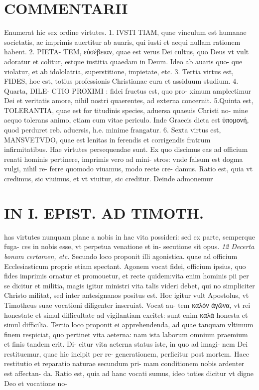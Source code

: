 \documentclass{article}
\begin{document}
\begin{pages}
\section*{COMMENTARII }
\marginpar{[ p.160 ]}\pstart Enumerat hic sex ordine virtutes. 1. IVSTI TIAM, quae vinculum est humanae societatis, ac imprimis auertitur ab auaris, qui iusti et aequi nullam rationem habent. 2. PIETA- TEM, εὐσέβειαν, quae est verus Dei cultus, quo Deus vt vult adoratur et colitur, estque iustitia quaedam in Deum. Ideo ab auaris quo- que violatur, et ab idololatria, superstitione, impietate, etc. 3. Tertia virtus est, FIDES, hoc est, totius professionis Christianae cura et assiduum studium. 4. Quarta, DILE- CTIO PROXIMI : fidei fructus est, quo pro- ximum amplectimur Dei et veritatis amore, nihil nostri quaerentes, ad externa concernit. 5.Quinta est, TOLERANTIA, quae est for titudinis species, aduersa quaeuis Christi no- mine aequo tolerans animo, etiam cum vitae periculo. Inde Graecis dicta est ὑπομονή, quod perduret reb. aduersis, h.e. minime frangatur. 6. Sexta virtus est, MANSVETVDO, quae est lenitas in ferendis et corrigendis fratrum infirmitatibus. Hae virtutes persequendae sunt. Ex quo discimus eas ad officium renati hominis pertinere, imprimis vero ad mini- stros: vnde falsum est dogma vulgi, nihil re- ferre quomodo viuamus, modo recte cre- damus.  \pend\pstart Ratio est, quia vt credimus, sic viuimus, et vt viuitur, sic creditur. Deinde admonemur  \pend
\section*{IN I. EPIST. AD TIMOTH. }
\marginpar{[ p.161 ]}\pstart has virtutes nunquam plane a nobis in hac vita possideri: sed ex parte, semperque fuga- ces in nobis esse, vt perpetua venatione et in- secutione sit opus.  \pend
\textit{12 Decerta bonum certamen, etc. }\pstart Secundo loco proponit illi agonistica. quae ad officium Ecclesiasticum proprie etiam spectant. Agonem vocat fidei, officium ipsius, quo fides imprimis ornatur et promouetur, et recte quidem:vita enim hominis pii per se dicitur et militia, magis igitur ministri vita talis videri debet, qui no simpliciter Christo militat, sed inter antesignanos positus est. Hoc igitur vult Apostolus, vt Timotheus suae vocationi diligenter inseruiat. Vocat au- tem καλόν ἀγῶνα, vt rei honestate et simul difficultate ad vigilantiam excitet: sunt enim καλὰ honesta et simul difficilia.  \pend\pstart Tertio loco proponit ei apprehendenda, ad quae tanquam vltimum finem respiciat, quo pertinet vita aeterna: nam ista laborum omnium praemium et finis tandem erit. Di- citur vita aeterna status iste, in quo ad imagi- nem Dei restituemur, quae hic incipit per re- generationem, perficitur post mortem. Haec restitutio et reparatio naturae secundum pri- mam conditionem nobis ardenter est affectan- da. Ratio est, quia ad hanc vocati sumus, ideo toties dicitur vt digne Deo et vocatione no-  \pend

\end{pages}
\end{document}
